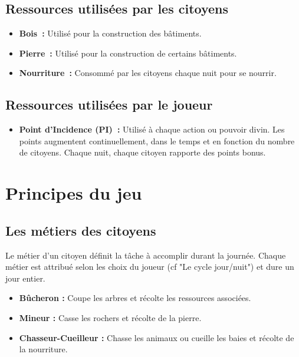 \documentclass[a4paper]{article}
\begin{document}
\subsection*{Ressources utilisées par les citoyens}
\begin{itemize}
\item \textbf{Bois :} \small Utilisé pour la construction des bâtiments. \normalsize
\item \textbf{Pierre :} \small Utilisé pour la construction de certains bâtiments. \normalsize
\item \textbf{Nourriture :} \small Consommé par les citoyens chaque nuit pour se nourrir. \normalsize
\end{itemize}

\subsection*{Ressources utilisées par le joueur}
\begin{itemize}
\item \textbf{Point d'Incidence (PI) :} \small Utilisé à chaque action ou pouvoir divin. Les points augmentent continuellement, dans le temps et en fonction du nombre de citoyens. Chaque nuit, chaque citoyen rapporte des points bonus. \normalsize
\end{itemize}


\section*{Principes du jeu}

\subsection*{Les métiers des citoyens}
Le métier d'un citoyen définit la tâche à accomplir durant la journée. Chaque métier est attribué selon les choix du joueur (cf "Le cycle jour/nuit") et dure un jour entier.
\begin{itemize}
\item \textbf{Bûcheron :} \small Coupe les arbres et récolte les ressources associées. \normalsize
\item \textbf{Mineur :} \small Casse les rochers et récolte de la pierre. \normalsize
\item \textbf{Chasseur-Cueilleur :} \small Chasse les animaux ou cueille les baies et récolte de la nourriture. \normalsize
\end{itemize}
\end{document}
